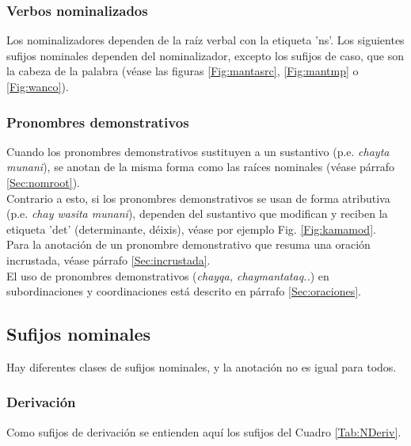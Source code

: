 \documentclass[a4paper,11pt,DIV12]{scrartcl}
\begin{document}
   \subsubsection{Verbos nominalizados}
Los nominalizadores dependen de la ra\'iz verbal con la etiqueta 'ns'. Los siguientes sufijos nominales dependen del nominalizador, excepto los sufijos de caso, que son la cabeza de la palabra (v\'ease las figuras \ref{Fig:mantasrc}, \ref{Fig:mantmp} o \ref{Fig:wanco}).

\subsubsection{Pronombres demonstrativos}

Cuando los pronombres demonstrativos sustituyen a un sustantivo (p.e. {\em chayta munani}), se anotan de la misma forma como las ra\'ices nominales (v\'ease p\'arrafo \ref{Sec:nomroot}).\\
Contrario a esto, si los pronombres demonstrativos se usan de forma atributiva (p.e. {\em chay wasita munani}), dependen del sustantivo que modifican y reciben la etiqueta 'det' (determinante, d\'eixis), v\'ease por ejemplo Fig. \ref{Fig:kamamod}.\\
Para la anotaci\'on de un pronombre demonstrativo que resuma una oraci\'on incrustada, v\'ease p\'arrafo \ref{Sec:incrustada}. \\
El uso de pronombres demonstrativos ({\em chayqa, chaymantataq..}) en subordinaciones y coordinaciones est\'a descrito en p\'arrafo \ref{Sec:oraciones}.


\subsection{Sufijos nominales}
  Hay diferentes clases de sufijos nominales, y la anotaci\'on no es igual para todos.
  \subsubsection{Derivaci\'on}
    Como sufijos de derivaci\'on se entienden aqu\'i los sufijos del Cuadro \ref{Tab:NDeriv}.
\end{document}
